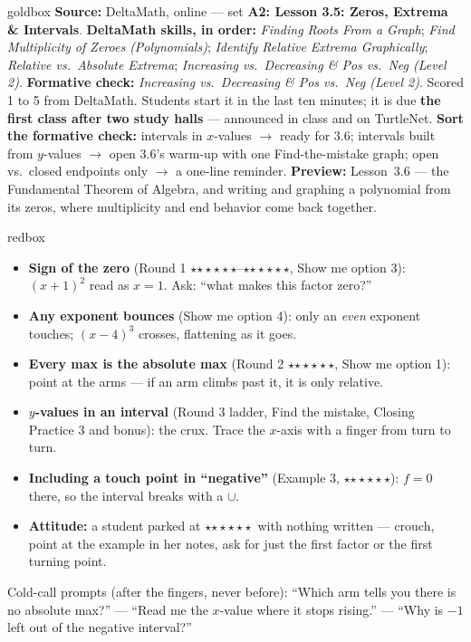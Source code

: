 \documentclass[10pt]{article}
\newcommand{\rung}[1]{{\color{goldacc}\ifcase#1\or$\star$\or$\star\star$\or$\star\star\star$\fi}}
\begin{document}
\boxguard
\begin{skillbox}{goldbox}
\textbf{Source:} DeltaMath, online --- set \textbf{A2: Lesson 3.5: Zeros, Extrema \& Intervals}.
\textbf{DeltaMath skills, in order:} \emph{Finding Roots From a Graph}; \emph{Find Multiplicity of Zeroes (Polynomials)}; \emph{Identify Relative Extrema Graphically}; \emph{Relative vs.\ Absolute Extrema}; \emph{Increasing vs.\ Decreasing \& Pos vs.\ Neg (Level 2)}. \textbf{Formative check:} \emph{Increasing vs.\ Decreasing \& Pos vs.\ Neg (Level 2)}. Scored 1 to 5 from DeltaMath. Students start it in the last ten minutes; it is
due \textbf{the first class after two study halls} --- announced in class and on TurtleNet.
\textbf{Sort the formative check:} intervals in $x$-values $\to$ ready for 3.6; intervals built
from $y$-values $\to$ open 3.6's warm-up with one Find-the-mistake graph; open vs.\ closed
endpoints only $\to$ a one-line reminder. \textbf{Preview:} Lesson~3.6 --- the Fundamental
Theorem of Algebra, and writing and graphing a polynomial from its zeros, where multiplicity and
end behavior come back together.
\end{skillbox}

\boxguard
\begin{skillbox}{redbox}
\begin{itemize}[leftmargin=1.2em, nosep]
  \item \textbf{Sign of the zero} (Round 1 \rung1--\rung2, Show me option 3): $(x+1)^2$ read as
        $x=1$. Ask: ``what makes this factor zero?''
  \item \textbf{Any exponent bounces} (Show me option 4): only an \emph{even} exponent touches;
        $(x-4)^3$ crosses, flattening as it goes.
  \item \textbf{Every max is the absolute max} (Round 2 \rung3, Show me option 1):
        point at the arms --- if an arm climbs past it, it is only relative.
  \item \textbf{$y$-values in an interval} (Round 3 ladder, Find the mistake, Closing Practice 3
        and bonus): the crux. Trace the $x$-axis with a finger from turn to turn.
  \item \textbf{Including a touch point in ``negative''} (Example 3, \rung3): $f=0$ there, so the
        interval breaks with a $\cup$.
  \item \textbf{Attitude:} a student parked at \rung1\ with nothing written --- crouch, point at
        the example in her notes, ask for just the first factor or the first turning point.
\end{itemize}
Cold-call prompts (after the fingers, never before): ``Which arm tells you there is no absolute
max?'' --- ``Read me the $x$-value where it stops rising.'' --- ``Why is $-1$ left out of the
negative interval?''
\end{skillbox}
\end{document}
